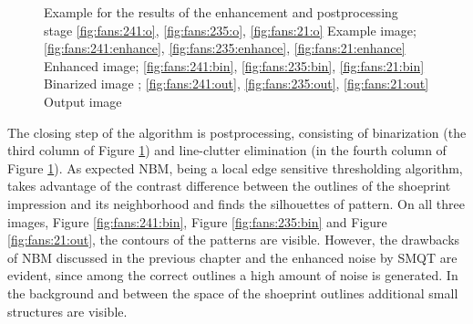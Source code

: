 \documentclass[draft,final]{vutinfth} %
\begin{document}
{\begin{figure}[H]

\caption{Example for the results of the enhancement and postprocessing stage
				\ref{fig:fans:241:o}, \ref{fig:fans:235:o}, \ref{fig:fans:21:o} Example image; \ref{fig:fans:241:enhance}, \ref{fig:fans:235:enhance}, \ref{fig:fans:21:enhance} Enhanced image; \ref{fig:fans:241:bin}, \ref{fig:fans:235:bin}, \ref{fig:fans:21:bin} Binarized image ; \ref{fig:fans:241:out}, \ref{fig:fans:235:out}, \ref{fig:fans:21:out} Output image}
\label{fig:fans:enhance}

\end{figure}
}
\par
The closing step of the algorithm is postprocessing, consisting of binarization (the third column of Figure \ref{fig:fans:enhance}) and line-clutter elimination (in the fourth column of Figure \ref{fig:fans:enhance}).
As expected NBM, being a local edge sensitive thresholding algorithm, takes advantage of the contrast difference between the outlines of the shoeprint impression and its neighborhood and finds the silhouettes of pattern. 
On all three images, Figure \ref{fig:fans:241:bin}, Figure \ref{fig:fans:235:bin} and Figure \ref{fig:fans:21:out}, the contours of the patterns are visible.
However, the drawbacks of NBM discussed in the previous chapter and the enhanced noise by SMQT are evident, since among the correct outlines a high amount of noise is generated.
In the background and between the space of the shoeprint outlines additional small structures are visible.
\end{document}
